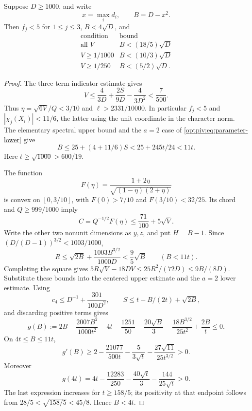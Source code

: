 \begin{lemma}
\label{optpiv:lem:concentration}\label{pivbd:lem:short-concentration}
Suppose $D\ge1000$, and write
\[
 x=\max_i d_i,\qquad B=D-x^2.
\]
Then $f_j<5$ for $1\le j\le3$, $B<4\sqrt D$, and
\begin{equation}\label{optpiv:eq:three-concentrations}
 \begin{array}{c|c}
 \text{condition}&\text{bound}\\ \hline
 \text{all }V&B<(18/5)\sqrt D\\
 V\ge1/1000&B<(10/3)\sqrt D\\
 V\ge1/250&B<(5/2)\sqrt D.
 \end{array}
\end{equation}
\end{lemma}
\begin{proof}
The three-term indicator estimate gives
\[
 V\le\frac4{3D}+\frac{2S}{9D}-\frac4{3D^2}<\frac7{500}.
\]
Thus $\eta=\sqrt{6V}/Q<3/10$ and $\ell>2331/10000$. In particular
$f_j<5$ and $|\chi_j(X_i)|<11/6$, the latter using the unit coordinate
in the character norm. The elementary spectral upper bound and the
$a=2$ case of \eqref{optpiv:eq:parameter-lower} give
\[
 B\le25+(4+11/6)S<25+245t/24<11t.
\]
Here $t\ge\sqrt{1000}>600/19$.

The function
\[
 F(\eta)=\frac{1+2\eta}{\sqrt{(1-\eta)(2+\eta)}}
\]
is convex on $[0,3/10]$, with $F(0)>7/10$ and $F(3/10)<32/25$.
Its chord and $Q\ge999/1000$ imply
\begin{equation}\label{optpiv:eq:C-linear}
 C=Q^{-1/2}F(\eta)\le\frac{71}{100}+5\sqrt V.
\end{equation}
Write the other two nonunit dimensions as $y,z$, and put $H=B-1$.
Since $(D/(D-1))^{3/2}<1003/1000$,
\begin{equation}\label{optpiv:eq:R-upper}
 R\le\sqrt{2B}+\frac{1003B^{3/2}}{1000D}
       <\frac95\sqrt B \qquad(B<11t).
\end{equation}
Completing the square gives
$5R\sqrt V-18DV\le25R^2/(72D)\le9B/(8D)$.
Substitute these bounds into the centered upper estimate and the
$a=2$ lower estimate. Using
\[
 c_4\le D^{-1}+\frac{301}{100D^2},\qquad
 S\le t-B/(2t)+\sqrt{2B},
\]
and discarding positive terms gives
\begin{equation}\label{optpiv:eq:g}
 g(B):=2B-\frac{2007B^2}{1000t^2}-4t-\frac{1251}{50}
 -\frac{20\sqrt B}{3}-\frac{18B^{3/2}}{25t^2}+\frac{2B}{t}\le0.
\end{equation}
On $4t\le B\le11t$,
\[
 g'(B)\ge2-\frac{21077}{500t}-\frac5{3\sqrt t}
              -\frac{27\sqrt{11}}{25t^{3/2}}>0.
\]
Moreover
\[
 g(4t)=4t-\frac{12283}{250}-\frac{40\sqrt t}{3}
                         -\frac{144}{25\sqrt t}>0.
\]
The last expression increases for $t\ge158/5$; its positivity at that
endpoint follows from $28/5<\sqrt{158/5}<45/8$. Hence $B<4t$.


\end{proof}
